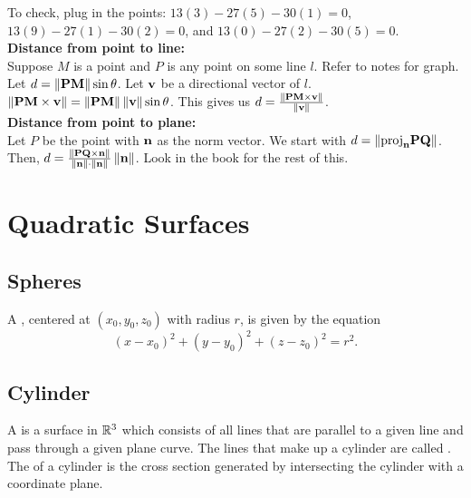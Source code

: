 To check, plug in the points: \(13(3) - 27(5) - 30(1) = 0\), \(13(9) - 27(1) - 30(2) = 0\), and \(13(0) - 27(2) - 30(5) = 0\). \\

\textbf{Distance from point to line:} \\

Suppose \(M\) is a point and \(P\) is any point on some line \(l\). Refer to notes for graph. Let \(d = \left\lVert \mathbf{PM}\right\rVert\sin \theta\). Let \(\mathbf{v}\) be a directional vector of \(l\). \\ 

\(\left\lVert \mathbf{PM \times v}\right\rVert = \left\lVert \mathbf{PM}\right\rVert\left\lVert \mathbf{v}\right\rVert\sin \theta\). This gives us \(d = \frac{\left\lVert \mathbf{PM \times v}\right\rVert}{\left\lVert \mathbf{v}\right\rVert}\). \\

\textbf{Distance from point to plane:} \\

Let \(P\) be the point with \(\mathbf{n}\) as the norm vector. We start with \(d = \left\lVert \mathbf{\text{proj}_{n}PQ}\right\rVert\). Then, \(d = \frac{\left\lVert \mathbf{PQ \times n}\right\rVert}{\left\lVert \mathbf{n}\right\rVert\cdot \left\lVert \mathbf{n}\right\rVert}\left\lVert \mathbf{n}\right\rVert\). Look in the book for the rest of this.




\section{Quadratic Surfaces}

\subsection{Spheres}

A , centered at \((x_{0},y_{0},z_{0})\) with radius \(r\), is given by the equation
\[
    (x - x_{0})^{2} + (y - y_{0})^{2} + (z - z_{0})^{2} = r^{2}.
\]

\subsection{Cylinder}

A  is a surface in \(\mathbb{R}^{3}\) which consists of all lines that are parallel to a given line and pass through a given plane curve. The lines that make up a cylinder are called . The  of a cylinder is the cross section generated by intersecting the cylinder with a coordinate plane.

